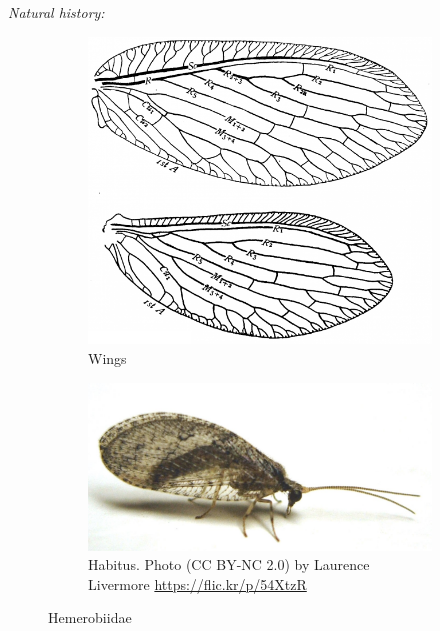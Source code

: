 \documentclass[letterpaper, 11pt]{article}
\begin{document}
\noindent{}\textit{Natural history:}\\

\begin{figure}[ht!]
    \centering
    \begin{subfigure}[ht!]{0.34\textwidth}
        \includegraphics[width=\textwidth]{HemerobiidWing}
        \caption{Wings \citep[][Fig. 153]{comstock1918wings}}
        \label{fig:hemerobiid1}
    \end{subfigure}
    \qquad
    \begin{subfigure}[ht!]{0.5\textwidth}
        \includegraphics[width=\textwidth]{HemerobiidHabitus}
        \caption{Habitus. Photo (CC BY-NC 2.0) by Laurence Livermore \url{https://flic.kr/p/54XtzR}}
        \label{fig:hemerobiid2}
    \end{subfigure}
    \caption{Hemerobiidae}\label{fig:hemerobiids}
\end{figure}
\end{document}
